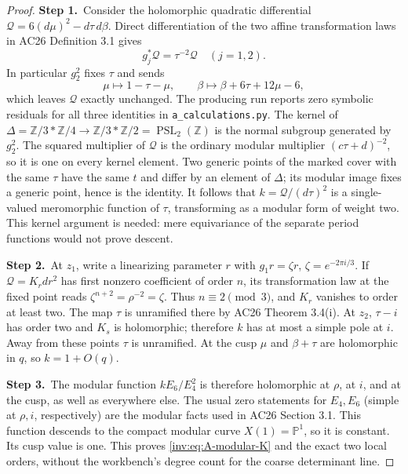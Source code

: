 \begin{proof}
\par\smallskip\noindent\textbf{Step 1.}\ Consider the holomorphic quadratic differential
$\mathscr Q=6(d\mu)^2-d\tau\,d\beta$.  Direct differentiation of
the two affine transformation laws in AC26 Definition 3.1 gives
\[
g_j^*\mathscr Q=\tau^{-2}\mathscr Q\quad(j=1,2).
\]
In particular $g_2^2$ fixes $\tau$ and sends
\[
\mu\longmapsto1-\tau-\mu,\qquad
\beta\longmapsto\beta+6\tau+12\mu-6,
\]
which leaves $\mathscr Q$ exactly unchanged.  The producing run reports zero symbolic residuals for all three identities in \texttt{a\_calculations.py}.
The kernel of
$\Delta=\mathbb Z/3*\mathbb Z/4\to\mathbb Z/3*\mathbb Z/2=\operatorname{PSL}_2(\mathbb Z)$
is the normal subgroup generated by $g_2^2$.  The squared multiplier
of $\mathscr Q$ is the ordinary modular multiplier
$(c\tau+d)^{-2}$, so it is one on every kernel element.  Two generic
points of the marked cover with the same $\tau$ have the same $t$
and differ by an element of $\Delta$; its modular image fixes a
generic point, hence is the identity.  It follows that
$k=\mathscr Q/(d\tau)^2$ is a single-valued meromorphic function of
$\tau$, transforming as a modular form of weight two.  This kernel
argument is needed: mere equivariance of the separate period functions
would not prove descent.

\par\smallskip\noindent\textbf{Step 2.}\ At $z_1$, write a linearizing parameter $r$ with
$g_1r=\zeta r$, $\zeta=e^{-2\pi i/3}$.  If $\mathscr Q=K_rdr^2$
has first nonzero coefficient of order $n$, its transformation law
at the fixed point reads $\zeta^{n+2}=\rho^{-2}=\zeta$.
Thus $n\equiv2\pmod3$, and $K_r$ vanishes to order at least two.
The map $\tau$ is unramified there by AC26 Theorem 3.4(i).  At
$z_2$, $\tau-i$ has order two and $K_s$ is holomorphic; therefore
$k$ has at most a simple pole at $i$.  Away from these points
$\tau$ is unramified.  At the cusp $\mu$ and $\beta+\tau$ are
holomorphic in $q$, so $k=1+O(q)$.

\par\smallskip\noindent\textbf{Step 3.}\ The modular function $k E_6/E_4^2$ is therefore holomorphic at
$\rho$, at $i$, and at the cusp, as well as everywhere else.
The usual zero statements for $E_4,E_6$ (simple at $\rho,i$,
respectively) are the modular facts used in AC26 Section 3.1.
This function descends to the compact modular curve $X(1)=\mathbb P^1$,
so it is constant.  Its cusp value is one.  This proves
\eqref{inv:eq:A-modular-K} and the exact two local orders, without the
workbench's degree count for the coarse determinant line.


\end{proof}
